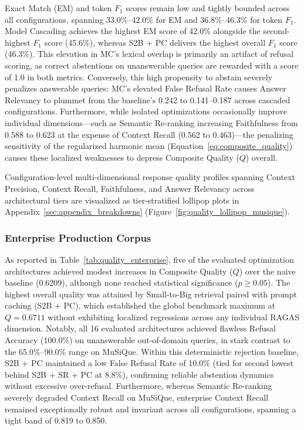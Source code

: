 Exact Match (EM) and token $F_1$ scores remain low and tightly bounded across all configurations, spanning 33.0\%--42.0\% for EM and 36.8\%--46.3\% for token $F_1$. Model Cascading achieves the highest EM score of 42.0\% alongside the second-highest $F_1$ score (45.6\%), whereas S2B + PC delivers the highest overall $F_1$ score (46.3\%). This elevation in MC's lexical overlap is primarily an artifact of refusal scoring, as correct abstentions on unanswerable queries are rewarded with a score of 1.0 in both metrics. Conversely, this high propensity to abstain severely penalizes answerable queries: MC's elevated False Refusal Rate causes Answer Relevancy to plummet from the baseline's 0.242 to 0.141--0.187 across cascaded configurations. Furthermore, while isolated optimizations occasionally improve individual dimensions---such as Semantic Re-ranking increasing Faithfulness from 0.588 to 0.623 at the expense of Context Recall (0.562 to 0.463)---the penalizing sensitivity of the regularized harmonic mean (Equation~\ref{eq:composite_quality}) causes these localized weaknesses to depress Composite Quality ($Q$) overall.

Configuration-level multi-dimensional response quality profiles spanning Context Precision, Context Recall, Faithfulness, and Answer Relevancy across architectural tiers are visualized as tier-stratified lollipop plots in Appendix~\ref{sec:appendix_breakdowns} (Figure~\ref{fig:quality_lollipop_musique}).

\subsubsection{Enterprise Production Corpus}
\label{subsubsec:quality_enterprise}

As reported in Table~\ref{tab:quality_enterprise}, five of the evaluated optimization architectures achieved modest increases in Composite Quality ($Q$) over the naive baseline (0.6209), although none reached statistical significance ($p \ge 0.05$). The highest overall quality was attained by Small-to-Big retrieval paired with prompt caching (S2B + PC), which established the global benchmark maximum at $Q = 0.6711$ without exhibiting localized regressions across any individual RAGAS dimension. Notably, all 16 evaluated architectures achieved flawless Refusal Accuracy (100.0\%) on unanswerable out-of-domain queries, in stark contrast to the 65.0\%--90.0\% range on MuSiQue. Within this deterministic rejection baseline, S2B + PC maintained a low False Refusal Rate of 10.0\% (tied for second lowest behind S2B + SR + PC at 8.8\%), confirming reliable abstention dynamics without excessive over-refusal. Furthermore, whereas Semantic Re-ranking severely degraded Context Recall on MuSiQue, enterprise Context Recall remained exceptionally robust and invariant across all configurations, spanning a tight band of 0.819 to 0.850. 


